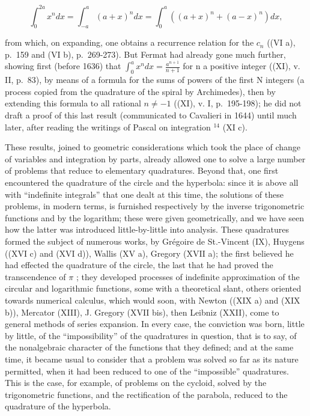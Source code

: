 \[
\int_ {0} ^ {2 a} x ^ {n} d x = \int_ {- a} ^ {a} (a + x) ^ {n} d x = \int_ {0} ^ {a} \left((a + x) ^ {n} + (a - x) ^ {n}\right) d x,
\]

from which, on expanding, one obtains a recurrence relation for the \(c_{n}\) ((VI a), p.~159 and (VI b), p.~269-273). But Fermat had already gone much further, showing first (before 1636) that \(\int_{0}^{a} x^{n} dx = \frac{a^{n+1}}{n+1}\) for n a positive integer ((XI), v. II, p.~83), by means of a formula for the sums of powers of the first N integers (a process copied from the quadrature of the spiral by Archimedes), then by extending this formula to all rational \(n \neq -1\) ((XI), v. I, p.~195-198); he did not draft a proof of this last result (communicated to Cavalieri in 1644) until much later, after reading the writings of Pascal on integration \({}^{14}\) (XI c).

These results, joined to geometric considerations which took the place of change of variables and integration by parts, already allowed one to solve a large number of problems that reduce to elementary quadratures. Beyond that, one first encountered the quadrature of the circle and the hyperbola: since it is above all with ``indefinite integrals'' that one dealt at this time, the solutions of these problems, in modern terms, is furnished respectively by the inverse trigonometric functions and by the logarithm; these were given geometrically, and we have seen how the latter was introduced little-by-little into analysis. These quadratures formed the subject of numerous works, by Grégoire de St.-Vincent (IX), Huygens ((XVI c) and (XVI d)), Wallis (XV a), Gregory (XVII a); the first believed he had effected the quadrature of the circle, the last that he had proved the transcendence of \(\pi\) ; they developed processes of indefinite approximation of the circular and logarithmic functions, some with a theoretical slant, others oriented towards numerical calculus, which would soon, with Newton ((XIX a) and (XIX b)), Mercator (XIII), J. Gregory (XVII bis), then Leibniz (XXII), come to general methods of series expansion. In every case, the conviction was born, little by little, of the ``impossibility'' of the quadratures in question, that is to say, of the nonalgebraic character of the functions that they defined; and at the same time, it became usual to consider that a problem was solved so far as its nature permitted, when it had been reduced to one of the ``impossible'' quadratures. This is the case, for example, of problems on the cycloid, solved by the trigonometric functions, and the rectification of the parabola, reduced to the quadrature of the hyperbola.

